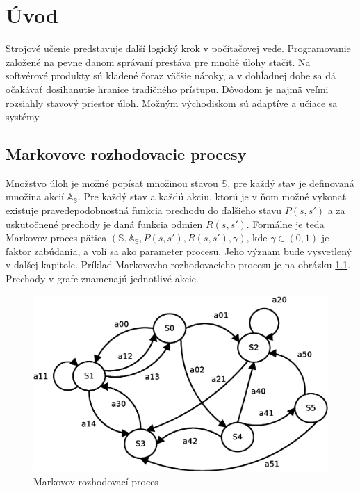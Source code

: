\chapter{Úvod}

Strojové učenie predstavuje ďalší logický krok v počítačovej vede. Programovanie
založené na pevne danom správaní prestáva pre mnohé úlohy stačiť. Na softvérové
produkty sú kladené čoraz väčšie nároky, a v dohĺadnej dobe sa dá očakávať
dosihanutie hranice tradičného prístupu. Dôvodom je najmä veľmi rozsiahly stavový priestor úloh.
Možným východiskom sú adaptíve a učiace sa systémy.

\section{Markovove rozhodovacie procesy}

Množstvo úloh je možné popísať množinou stavou $\mathbb{S}$, pre každý stav je definovaná množina akcií
$\mathbb{A_S}$. Pre každý stav a každú akciu, ktorú je v ňom možné vykonať existuje pravedepodobnostná
funkcia prechodu do ďalšieho stavu $P(s, s')$ a za uskutočnené prechody je daná funkcia odmien $R(s, s')$.
Formálne je teda Markovov proces pätica $(\mathbb{S}, \mathbb{A_S}, P(s, s'), R(s, s'), \gamma )$,
kde $\gamma \in (0, 1)$ je faktor zabúdania, a volí sa ako parameter procesu. Jeho význam bude vysvetlený
v ďalšej kapitole. Príklad Markovovho rozhodovacieho procesu je na obrázku \ref{img:markovov_decision_process}.
Prechody v grafe znamenajú jednotlivé akcie.

\begin{figure}[!htb]
\center
\includegraphics[scale=.5]{../diagrams/markovov_process.eps}
\caption{Markovov rozhodovací proces}
\label{img:markovov_decision_process}
\end{figure}

